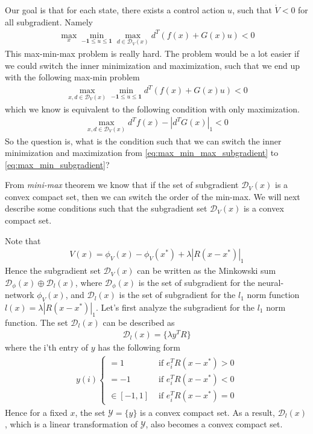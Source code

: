 \documentclass{article}
\begin{document}
Our goal is that for each state, there exists a control action $u$, such that $\dot{V} < 0$ for all subgradient. Namely
\begin{align}
	\max_x \min_{-\mathbf{1}\le u \le \mathbf{1}} \max_{d\in\mathcal{D}_V(x)} d^T(f(x) + G(x)u) < 0\label{eq:max_min_max_subgradient}
\end{align}
This max-min-max problem is really hard. The problem would be a lot easier if we could switch the inner minimization and maximization, such that we end up with the following max-min problem
\begin{align}
	\max_{x, d\in\mathcal{D}_V(x)} \min_{-\mathbf{1}\le u \le \mathbf{1}} d^T(f(x)+G(x)u) < 0 \label{eq:max_min_subgradient}
\end{align}
which we know is equivalent to the following condition with only maximization.
\begin{align}
	\max_{x, d\in\mathcal{D}_V(x)}d^Tf(x) - |d^TG(x)|_1 < 0 \label{eq:max_subgradient}
\end{align}
So the question is, what is the condition such that we can switch the inner minimization and maximization from \eqref{eq:max_min_max_subgradient} to \eqref{eq:max_min_subgradient}?

From \textit{mini-max} theorem we know that if the set of subgradient $\mathcal{D}_V(x)$ is a convex compact set, then we can switch the order of the min-max. We will next describe some conditions such that the subgradient set $\mathcal{D}_V(x)$ is a convex compact set.

Note that
\begin{align}
	V(x) = \phi_V(x) - \phi_V(x^*) + \lambda |R(x-x^*)|_1
\end{align}
Hence the subgradient set $\mathcal{D}_V(x)$ can be written as the Minkowski sum $\mathcal{D}_\phi(x) \oplus \mathcal{D}_l(x)$, where $\mathcal{D}_\phi(x)$ is the set of subgradient for the neural-network $\phi_V(x)$, and $\mathcal{D}_l(x)$ is the set of subgradient for the $l_1$ norm function $l(x) = \lambda |R(x-x^*)|_1$. Let's first analyze the subgradient for the $l_1$ norm function. The set $\mathcal{D}_l(x)$ can be described as
\begin{align}
	\mathcal{D}_l(x) = \{\lambda y^TR\}
\end{align}
where the i'th entry of $y$ has the following form
\begin{align}
	y(i)\begin{cases}
		= 1 & \text{ if } e_i^TR(x - x^*) > 0\\
		= -1 & \text{ if }e_i^TR(x - x^*) < 0\\
		\in [-1, 1] &\text { if } e_i^TR(x - x^*) = 0
	\end{cases}
\end{align}
Hence for a fixed $x$, the set $\mathcal{Y} = \{y\}$ is a convex compact set. As a result, $\mathcal{D}_l(x)$, which is a linear transformation of $\mathcal{Y}$, also becomes a convex compact set.
\end{document}
